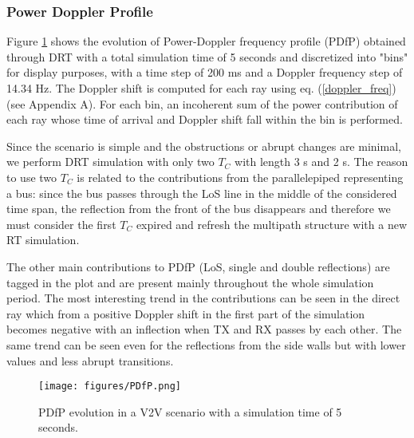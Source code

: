 \subsubsection{Power Doppler Profile}
Figure \ref{PDfP} shows the evolution of Power-Doppler frequency profile (PDfP) obtained through DRT with a total simulation time of 5 seconds and discretized into "bins" for display purposes, with a time step of 200 ms and a Doppler frequency step of 14.34 Hz. The Doppler shift is computed for each ray using eq. (\ref{doppler_freq}) (see Appendix A). For each bin, an incoherent sum of the power contribution of each ray whose time of arrival and Doppler shift fall within the bin is performed. 

Since the scenario is simple and the obstructions or abrupt changes are minimal, we perform DRT simulation with only two $T_C$ with length 3 s and 2 s. The reason to use two $T_C$ is related to the contributions from the parallelepiped representing a bus: since the bus passes through the LoS line in the middle of the considered time span, the reflection from the front of the bus disappears and therefore we must consider the first $T_C$ expired and refresh the multipath structure with a new RT simulation.\par 
The other main contributions to PDfP (LoS, single and double reflections) are tagged in the plot and are present mainly throughout the whole simulation period. The most interesting trend in the contributions can be seen in the direct ray which from a positive Doppler shift in the first part of the simulation becomes negative with an inflection when TX and RX passes by each other. The same trend can be seen even for the reflections from the side walls but with lower values and less abrupt transitions. 

\begin{figure}[h!]
	\centering
	\texttt{[image: figures/PDfP.png]}
	\caption{PDfP evolution in a V2V scenario with a simulation time of 5 seconds.}
	\label{PDfP}
\end{figure} 

